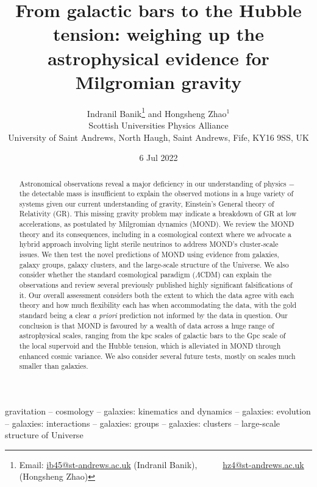 \documentclass[fleqn,usenatbib,useAMS,onecolumn]{mnras} %
\title[Weighing up the astrophysical evidence for MOND]{From galactic bars to the Hubble tension: weighing up the astrophysical evidence for Milgromian gravity} %
\author[Indranil Banik \& Hongsheng Zhao]{Indranil Banik\thanks{Email: \href{mailto:ib45@st-andrews.ac.uk}{ib45@st-andrews.ac.uk} (Indranil Banik),\newline $~~~~~~~~~~~~$ \href{mailto:hz4@st-andrews.ac.uk}{hz4@st-andrews.ac.uk} (Hongsheng Zhao)} and Hongsheng Zhao$^{1}$ \vspace{10pt} \\
Scottish Universities Physics Alliance\\ University of Saint Andrews, North Haugh, Saint Andrews, Fife, KY16 9SS, UK}
\begin{document}
\label{firstpage}
\pagerange{\pageref{firstpage}--\pageref{lastpage}}
\date{6 Jul 2022}

\maketitle

\begin{abstract} %
Astronomical observations reveal a major deficiency in our understanding of physics $-$ the detectable mass is insufficient to explain the observed motions in a huge variety of systems given our current understanding of gravity, Einstein's General theory of Relativity (GR). This missing gravity problem may indicate a breakdown of GR at low accelerations, as postulated by Milgromian dynamics (MOND). We review the MOND theory and its consequences, including in a cosmological context where we advocate a hybrid approach involving light sterile neutrinos to address MOND's cluster-scale issues. We then test the novel predictions of MOND using evidence from galaxies, galaxy groups, galaxy clusters, and the large-scale structure of the Universe. We also consider whether the standard cosmological paradigm ($\Lambda$CDM) can explain the observations and review several previously published highly significant falsifications of it. Our overall assessment considers both the extent to which the data agree with each theory and how much flexibility each has when accommodating the data, with the gold standard being a clear \emph{a priori} prediction not informed by the data in question. Our conclusion is that MOND is favoured by a wealth of data across a huge range of astrophysical scales, ranging from the kpc scales of galactic bars to the Gpc scale of the local supervoid and the Hubble tension, which is alleviated in MOND through enhanced cosmic variance. We also consider several future tests, mostly on scales much smaller than galaxies.


\end{abstract}

\begin{keywords}
	gravitation -- cosmology -- galaxies: kinematics and dynamics -- galaxies: evolution -- galaxies: interactions -- galaxies: groups -- galaxies: clusters -- large-scale structure of Universe
\end{keywords}
\end{document}
